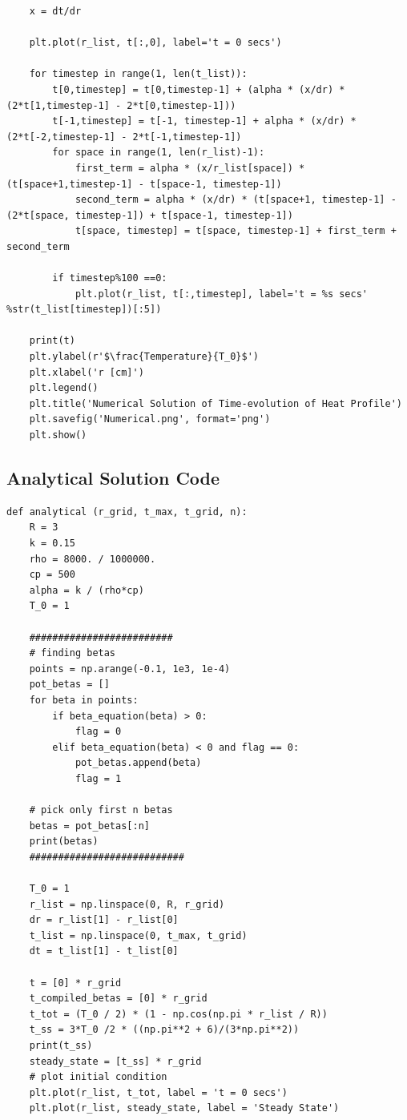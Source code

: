 \documentclass[12pt,letterpaper]{article}
\begin{document}
{{\begin{verbatim}
    x = dt/dr
    
    plt.plot(r_list, t[:,0], label='t = 0 secs')

    for timestep in range(1, len(t_list)):
        t[0,timestep] = t[0,timestep-1] + (alpha * (x/dr) * (2*t[1,timestep-1] - 2*t[0,timestep-1]))
        t[-1,timestep] = t[-1, timestep-1] + alpha * (x/dr) * (2*t[-2,timestep-1] - 2*t[-1,timestep-1])
        for space in range(1, len(r_list)-1):
            first_term = alpha * (x/r_list[space]) * (t[space+1,timestep-1] - t[space-1, timestep-1])
            second_term = alpha * (x/dr) * (t[space+1, timestep-1] - (2*t[space, timestep-1]) + t[space-1, timestep-1])
            t[space, timestep] = t[space, timestep-1] + first_term + second_term

        if timestep%100 ==0:
            plt.plot(r_list, t[:,timestep], label='t = %s secs' %str(t_list[timestep])[:5])

    print(t)
    plt.ylabel(r'$\frac{Temperature}{T_0}$')
    plt.xlabel('r [cm]')
    plt.legend()
    plt.title('Numerical Solution of Time-evolution of Heat Profile')
    plt.savefig('Numerical.png', format='png')
    plt.show()

\end{verbatim}


\subsection*{Analytical Solution Code}
\begin{verbatim}
def analytical (r_grid, t_max, t_grid, n):
    R = 3
    k = 0.15
    rho = 8000. / 1000000.
    cp = 500
    alpha = k / (rho*cp)
    T_0 = 1

    #########################
    # finding betas
    points = np.arange(-0.1, 1e3, 1e-4)
    pot_betas = []
    for beta in points:
        if beta_equation(beta) > 0:
            flag = 0
        elif beta_equation(beta) < 0 and flag == 0:
            pot_betas.append(beta)
            flag = 1

    # pick only first n betas
    betas = pot_betas[:n]
    print(betas)
    ###########################

    T_0 = 1
    r_list = np.linspace(0, R, r_grid)
    dr = r_list[1] - r_list[0]
    t_list = np.linspace(0, t_max, t_grid)
    dt = t_list[1] - t_list[0]

    t = [0] * r_grid
    t_compiled_betas = [0] * r_grid
    t_tot = (T_0 / 2) * (1 - np.cos(np.pi * r_list / R))
    t_ss = 3*T_0 /2 * ((np.pi**2 + 6)/(3*np.pi**2))
    print(t_ss)
    steady_state = [t_ss] * r_grid
    # plot initial condition
    plt.plot(r_list, t_tot, label = 't = 0 secs')
    plt.plot(r_list, steady_state, label = 'Steady State')


\end{verbatim}}}
\end{document}
